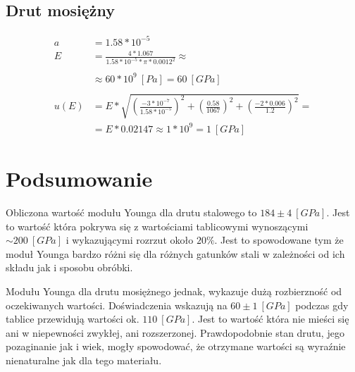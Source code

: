 \documentclass[a4paper,10pt,twoside]{article}
\begin{document}
\subsection{Drut mosiężny}
\begin{equation*}
\begin{split}
a&=1.58*10^{-5}\\
E&=\frac{4*1.067}{1.58*10^{-5}*\pi*0.0012^2}\approx\\\\
&\approx 60*10^9~[Pa] = 60~[GPa]\\
\\
u(E)&=E*\sqrt{\left(\frac{-3*10^{-7}}{1.58*10^{-5}} \right )^2+\left(\frac{0.58}{1067} \right )^2+\left(\frac{-2*0.006}{1.2} \right )^2}=\\
&=E*0.02147 \approx 1*10^9 = 1~[GPa]
\end{split}
\end{equation*}

\newpage
\section{Podsumowanie}
Obliczona wartość modułu Younga dla drutu stalowego to $184 \pm 4~[GPa]$. Jest to wartość która pokrywa się z wartościami tablicowymi
wynoszącymi $\sim200~[GPa]$ i wykazującymi rozrzut około $20\%$. Jest to spowodowane tym że moduł Younga bardzo różni się dla różnych
gatunków stali w zależności od ich składu jak i sposobu obróbki.

Modułu Younga dla drutu mosiężnego jednak, wykazuje dużą rozbierzność od oczekiwanych wartości. Doświadczenia wskazują na $60 \pm 1~[GPa]$
podczas gdy tablice przewidują wartości ok. $110~[GPa]$. Jest to wartość która nie mieści się ani w niepewności zwykłej, ani rozszerzonej.
Prawdopodobnie stan drutu, jego pozaginanie jak i wiek, mogły spowodować, że otrzymane wartości są wyraźnie nienaturalne jak
dla tego materiału.
\end{document}
